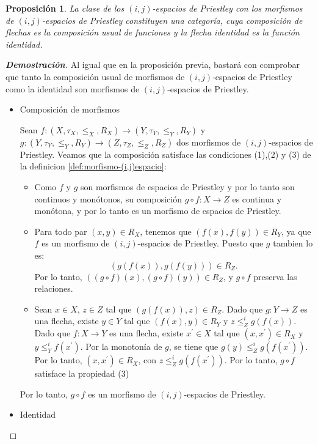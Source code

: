 \documentclass[12pt]{book}
\newtheorem{proposition}[theorem]{Proposición}
\begin{document}
\begin{proposition} La clase de los $(i,j)$-espacios de Priestley con los morfismos de $(i,j)$-espacios de Priestley constituyen una categoría, cuya composición de flechas es la composición usual de funciones y la flecha identidad es la función identidad.  
\end{proposition}


\begin{proof}[\textbf{Demostración}]
Al igual que en la proposición previa, bastará con comprobar que tanto la composición usual de morfismos de $(i,j)$-espacios de Priestley como la identidad son morfismos de $(i,j)$-espacios de Priestley.
\begin{itemize}
\item[1.] Composición de morfismos

Sean $f: (X, \tau_X, \leq_X, R_X) \to (Y, \tau_Y, \leq_Y, R_Y)$ y $g: (Y, \tau_Y, \leq_Y, R_Y) \to (Z, \tau_Z, \leq_Z, R_Z)$ dos morfismos de $(i,j)$-espacios de Priestley. Veamos que la composición satisface las condiciones (1),(2) y (3) de la definicion \ref{def:morfismo-(i,j)espacio}:
\begin{itemize}
    \item Como $f$ y $g$ son morfismos de espacios de Priestley y por lo tanto son continuos y monótonos, su composición $g \circ f: X \to Z$ es continua y monótona, y por lo tanto es un morfismo de espacios de Priestley.
    \item Para todo par \((x, y) \in R_X\), tenemos que $(f(x), f(y)) \in R_Y$, ya que $f$ es un morfismo de $(i,j)$-espacios de Priestley. Puesto que $g$ tambien lo es:
    \[
    (g(f(x)), g(f(y))) \in R_Z.
    \]
    Por lo tanto, $((g \circ f)(x), (g \circ f)(y)) \in R_Z$, y \(g \circ f\) preserva las relaciones.
    \item Sean $x \in X$, $z \in Z$ tal que $(g(f(x)),z) \in R_{Z}$. Dado que $g \colon Y \to Z$ es una flecha, existe $y \in Y$ tal que $(f(x),y) \in R_{Y}$ y $z \leq_{Z}^{i} g(f(x))$. Dado que $f \colon X \to Y$ es una flecha, existe $x^{\prime} \in X$ tal que $(x,x^{\prime}) \in R_{X}$ y $y \leq_{Y}^{i} f(x^{\prime})$. Por la monotonía de $g$, se tiene que $g(y) \leq_{Z}^{i} g(f(x^{\prime}))$. Por lo tanto, $(x,x^{\prime}) \in R_{X}$, con $z \leq_{Z}^{i} g(f(x^{\prime}))$. Por lo tanto, $g \circ f$ satisface la propiedad (3)
\end{itemize}
Por lo tanto, \(g \circ f\) es un morfismo de $(i,j)$-espacios de Priestley.

\item[2.] Identidad


\end{itemize}
\end{proof}
\end{document}
